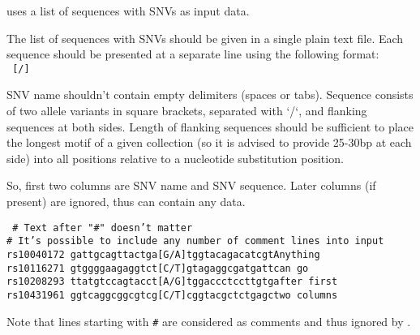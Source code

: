  uses a list of sequences with SNVs as input data.

The list of sequences with SNVs should be given in a single plain text file. 
Each sequence should be presented at a separate line using the following format:\\
\texttt{ [/]}

SNV name shouldn't contain empty delimiters (spaces or tabs). 
Sequence consists of two allele variants in square brackets, separated with `/`, and flanking sequences at both sides. Length of flanking sequences should be sufficient to place the longest motif of a given collection (so it is advised to provide 25-30bp at each side) into all positions relative to a nucleotide substitution position. 

So, first two columns are SNV name and SNV sequence. Later columns (if present) are ignored, thus can contain any data.

\noindent\texttt{%
\# Text after "\#" doesn't matter\\
\# It's possible to include any number of comment lines into input\\
rs10040172 gattgcagttactga[G/A]tggtacagacatcgt\quad Anything\\
rs10116271 gtggggaagaggtct[C/T]gtagaggcgatgatt\quad can go\\
rs10208293 ttatgtccagtacct[A/G]tggaccctccttgtg\quad after first\\
rs10431961 ggtcaggcggcgtcg[C/T]cggtacgctctgagc\quad two columns
}

\vspace{1.5ex}
Note that lines starting with \texttt{\#} are considered as comments and thus ignored by .
